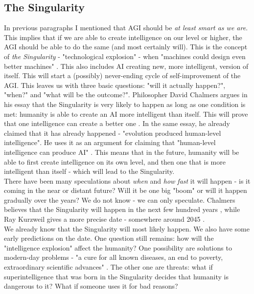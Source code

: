 \documentclass[12pt]{article}
\begin{document}
\subsection{The Singularity}
	In previous paragraphs I mentioned that AGI should be \emph{at least smart as we are}. This implies that if we are able to create intelligence on our level or higher, the AGI should be able to do the same (and most certainly will). This is the concept of \emph{the Singularity} - "technological explosion" - when "machines could design even better machines" \cite{singularity:1}. This also includes AI creating new, more intelligent, version of itself. This will start a (possibly) never-ending cycle of self-improvement of the AGI. This leaves us with three basic questions: "will it actually happen?", "when?" and "what will be the outcome?". Philosopher David Chalmers argues in his essay that the Singularity is very likely to happen as long as one condition is met: humanity is able to create an AI more intelligent than itself. This will prove that one intelligence can create a better one \cite{singularity:3}. In the same essay, he already claimed that it has already happened - "evolution produced human-level intelligence". He uses it as an argument for claiming that "human-level intelligence can produce AI" \cite{singularity:3}. This means that in the future, humanity will be able to first create intelligence on its own level, and then one that is more intelligent than itself - which will lead to the Singularity. 
	\\There have been many speculations about \emph{when} and \emph{how fast} it will happen - is it coming in the near or distant future? Will it be one big "boom" or will it happen gradually over the years? We do not know - we can only speculate. Chalmers believes that the Singularity will happen in the next few hundred years \cite{singularity:2}\cite{singularity:3}, while Ray Kurzweil gives a more precise date - somewhere around 2045 \cite{singularity:2}\cite{singularity:4}.
	\\We already know that the Singularity will most likely happen. We also have some early predictions on the date. One question still remains: how will the "intelligence explosion" affect the humanity? One possibility are solutions to modern-day problems - "a cure for all known diseases, an end to poverty, extraordinary scientific advances" \cite{singularity:3}. The other one are threats: what if superintelligence that was born in the Singularity decides that humanity is dangerous to it? What if someone uses it for bad reasons? 
\end{document}
